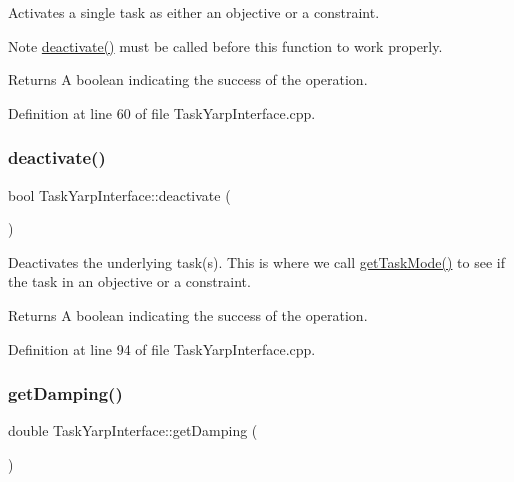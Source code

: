Activates a single task as either an objective or a constraint. \begin{DoxyNote}{Note}
{\ttfamily \hyperlink{classocra_1_1TaskYarpInterface_a4189dabbbaf0e5efe338dfb94e506407}{deactivate()}} must be called before this function to work properly.
\end{DoxyNote}
\begin{DoxyReturn}{Returns}
A boolean indicating the success of the operation. 
\end{DoxyReturn}


Definition at line 60 of file Task\+Yarp\+Interface.\+cpp.

\hypertarget{classocra_1_1TaskYarpInterface_a4189dabbbaf0e5efe338dfb94e506407}{}\label{classocra_1_1TaskYarpInterface_a4189dabbbaf0e5efe338dfb94e506407} 
\subsubsection{\texorpdfstring{deactivate()}{deactivate()}}
{\footnotesize\ttfamily bool Task\+Yarp\+Interface\+::deactivate (\begin{DoxyParamCaption}{ }\end{DoxyParamCaption})}

Deactivates the underlying task(s). This is where we call \hyperlink{classocra_1_1TaskYarpInterface_a37db4979419a10881dd8f888330cfa28}{get\+Task\+Mode()} to see if the task in an objective or a constraint.

\begin{DoxyReturn}{Returns}
A boolean indicating the success of the operation. 
\end{DoxyReturn}


Definition at line 94 of file Task\+Yarp\+Interface.\+cpp.

\hypertarget{classocra_1_1TaskYarpInterface_ae458959630ee96b24ce9dcfa174994bc}{}\label{classocra_1_1TaskYarpInterface_ae458959630ee96b24ce9dcfa174994bc} 
\subsubsection{\texorpdfstring{get\+Damping()}{getDamping()}}
{\footnotesize\ttfamily double Task\+Yarp\+Interface\+::get\+Damping (\begin{DoxyParamCaption}{ }\end{DoxyParamCaption})}

